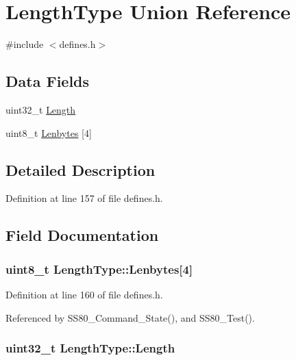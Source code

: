 \hypertarget{unionLengthType}{\section{Length\-Type Union Reference}
\label{unionLengthType}
}


{\ttfamily \#include $<$defines.\-h$>$}

\subsection*{Data Fields}
\begin{DoxyCompactItemize}
\item 
uint32\-\_\-t \hyperlink{unionLengthType_a27186a51a0bcb9e93e44b9f1e49e5f27}{Length}
\item 
uint8\-\_\-t \hyperlink{unionLengthType_a51f62c21aa27a0cbe1c99de05e33fcf7}{Lenbytes} \mbox{[}4\mbox{]}
\end{DoxyCompactItemize}


\subsection{Detailed Description}


Definition at line 157 of file defines.\-h.



\subsection{Field Documentation}
\hypertarget{unionLengthType_a51f62c21aa27a0cbe1c99de05e33fcf7}{
\subsubsection[{Lenbytes}]{\setlength{\rightskip}{0pt plus 5cm}uint8\-\_\-t Length\-Type\-::\-Lenbytes\mbox{[}4\mbox{]}}}\label{unionLengthType_a51f62c21aa27a0cbe1c99de05e33fcf7}


Definition at line 160 of file defines.\-h.



Referenced by S\-S80\-\_\-\-Command\-\_\-\-State(), and S\-S80\-\_\-\-Test().

\hypertarget{unionLengthType_a27186a51a0bcb9e93e44b9f1e49e5f27}{
\subsubsection[{Length}]{\setlength{\rightskip}{0pt plus 5cm}uint32\-\_\-t Length\-Type\-::\-Length}}\label{unionLengthType_a27186a51a0bcb9e93e44b9f1e49e5f27}


